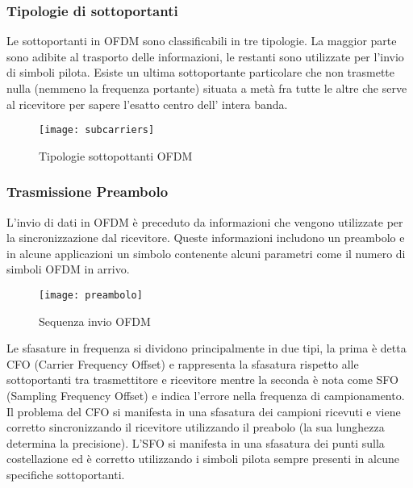 \begin{itemize}
 
 \subsubsection{Tipologie di sottoportanti}
 Le sottoportanti in OFDM sono classificabili in tre tipologie. La maggior parte sono adibite al trasporto delle informazioni, le restanti sono utilizzate per l'invio di simboli pilota. Esiste un ultima sottoportante particolare che non trasmette nulla (nemmeno la frequenza portante) situata a metà fra tutte le altre che serve al ricevitore per sapere l'esatto centro dell' intera banda.
 \begin{figure}[h]
 	\centering
 	\texttt{[image: subcarriers]}
 	\caption{Tipologie sottopottanti OFDM \cite{subcarriers}}\label{fig:1}
 \end{figure}
  \subsubsection{Trasmissione Preambolo}
	L'invio di dati in OFDM è preceduto da informazioni che vengono utilizzate per la sincronizzazione dal ricevitore. Queste informazioni includono un preambolo e in alcune applicazioni un simbolo contenente alcuni parametri come il numero di simboli OFDM in arrivo.
	\begin{figure}[h!]
		\centering
		\texttt{[image: preambolo]}
		\caption{Sequenza invio OFDM \cite{subcarriers}}\label{fig:1}
	\end{figure}
 
  Le sfasature in frequenza si dividono principalmente in due tipi, la prima è detta CFO (Carrier Frequency Offset) e rappresenta la sfasatura rispetto alle sottoportanti tra trasmettitore e ricevitore mentre la seconda è nota come SFO (Sampling Frequency Offset) e indica l'errore nella frequenza di campionamento. Il problema del CFO si manifesta in una sfasatura dei campioni ricevuti e viene corretto sincronizzando il ricevitore utilizzando il preabolo (la sua lunghezza determina la precisione). L'SFO si manifesta in una sfasatura dei punti sulla costellazione ed è corretto utilizzando i simboli pilota sempre presenti in alcune specifiche sottoportanti. \cite{FOOFDM}


\end{itemize}
